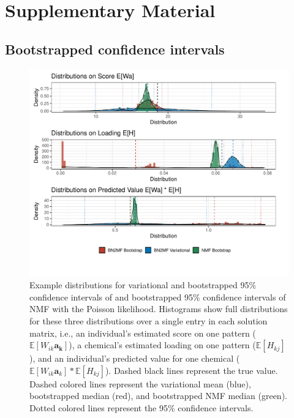 {\setcounter{figure}{0} %
\setcounter{table}{0}
\renewcommand{\thefigure}{3.S.\arabic{figure}}
\renewcommand{\thetable}{3.S.\arabic{table}}
\clearpage
\section{Supplementary Material}
\label{sec6}

\subsection{Bootstrapped confidence intervals}
\begin{figure}[!h]
\caption[Comparison of variational and bootstrapped confidence intervals]{Example distributions for variational and bootstrapped 95\% confidence intervals of \bnmf and bootstrapped 95\% confidence intervals of NMF with the Poisson likelihood. Histograms show full distributions for these three distributions over a single entry in each solution matrix, i.e., an individual's estimated score on one pattern ($\mathbb{E}[W_{i k}\mathbf{a_k}]$), a chemical's estimated loading on one pattern ($\mathbb{E}[H_{k j}]$), and an individual's predicted value for one chemical ($\mathbb{E}[W_{i k}\mathbf{a}_k]*\mathbb{E}[H_{k j}]$). Dashed black lines represent the true value. Dashed colored lines represent the variational mean (blue), bootstrapped \bnmf median (red), and bootstrapped NMF median (green). Dotted colored lines represent the 95\% confidence intervals.}
\label{fig:ci_dist}
\centering
\includegraphics[scale = 0.65]{./figures/vci_bci_nmfci.pdf}
\end{figure}

}

